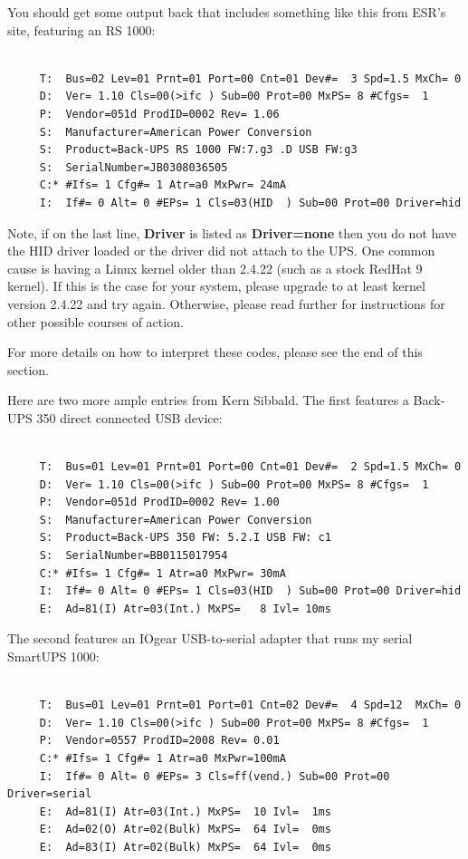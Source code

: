 You should get some output back that includes something like this from ESR's
site, featuring an RS 1000: 

\footnotesize
\begin{verbatim}
     
     T:  Bus=02 Lev=01 Prnt=01 Port=00 Cnt=01 Dev#=  3 Spd=1.5 MxCh= 0
     D:  Ver= 1.10 Cls=00(>ifc ) Sub=00 Prot=00 MxPS= 8 #Cfgs=  1
     P:  Vendor=051d ProdID=0002 Rev= 1.06
     S:  Manufacturer=American Power Conversion
     S:  Product=Back-UPS RS 1000 FW:7.g3 .D USB FW:g3
     S:  SerialNumber=JB0308036505
     C:* #Ifs= 1 Cfg#= 1 Atr=a0 MxPwr= 24mA
     I:  If#= 0 Alt= 0 #EPs= 1 Cls=03(HID  ) Sub=00 Prot=00 Driver=hid
\end{verbatim}
\normalsize

Note, if on the last line, {\bf Driver} is listed as {\bf Driver=none} then
you do not have the HID driver loaded or the driver did not attach to the UPS.
One common cause is having a Linux kernel older than 2.4.22 (such as a stock
RedHat 9 kernel). If this is the case for your system, please upgrade to at
least kernel version 2.4.22 and try again.  Otherwise, please read further for
instructions for other possible courses of action.  

For more details on how to interpret these codes, please see the end of this
section.  

Here are two more ample entries from Kern Sibbald.  The first features a
Back-UPS 350 direct connected USB device: 

\footnotesize
\begin{verbatim}
     
     T:  Bus=01 Lev=01 Prnt=01 Port=00 Cnt=01 Dev#=  2 Spd=1.5 MxCh= 0
     D:  Ver= 1.10 Cls=00(>ifc ) Sub=00 Prot=00 MxPS= 8 #Cfgs=  1
     P:  Vendor=051d ProdID=0002 Rev= 1.00
     S:  Manufacturer=American Power Conversion
     S:  Product=Back-UPS 350 FW: 5.2.I USB FW: c1
     S:  SerialNumber=BB0115017954
     C:* #Ifs= 1 Cfg#= 1 Atr=a0 MxPwr= 30mA
     I:  If#= 0 Alt= 0 #EPs= 1 Cls=03(HID  ) Sub=00 Prot=00 Driver=hid
     E:  Ad=81(I) Atr=03(Int.) MxPS=   8 Ivl= 10ms
\end{verbatim}
\normalsize

The second features an IOgear USB-to-serial adapter that runs my serial
SmartUPS 1000: 

\footnotesize
\begin{verbatim}
     
     T:  Bus=01 Lev=01 Prnt=01 Port=01 Cnt=02 Dev#=  4 Spd=12  MxCh= 0
     D:  Ver= 1.10 Cls=00(>ifc ) Sub=00 Prot=00 MxPS= 8 #Cfgs=  1
     P:  Vendor=0557 ProdID=2008 Rev= 0.01
     C:* #Ifs= 1 Cfg#= 1 Atr=a0 MxPwr=100mA
     I:  If#= 0 Alt= 0 #EPs= 3 Cls=ff(vend.) Sub=00 Prot=00 Driver=serial
     E:  Ad=81(I) Atr=03(Int.) MxPS=  10 Ivl=  1ms
     E:  Ad=02(O) Atr=02(Bulk) MxPS=  64 Ivl=  0ms
     E:  Ad=83(I) Atr=02(Bulk) MxPS=  64 Ivl=  0ms
\end{verbatim}
\normalsize

